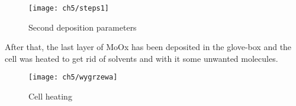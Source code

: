 \begin{figure}[H]
\centering
\texttt{[image: ch5/steps1]}
\caption{Second deposition parameters}
\label{fig:steps1}
\end{figure}

After that, the last layer of MoOx has been deposited in the glove-box and the cell was heated to get rid of solvents and with it some unwanted molecules. 

\begin{figure}
\centering
\texttt{[image: ch5/wygrzewa]}
\caption{Cell heating}
\end{figure}

